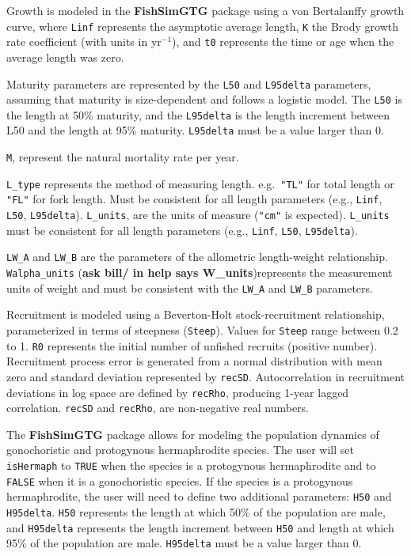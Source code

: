 \documentclass[
]{book}
\begin{document}
Growth is modeled in the \textbf{FishSimGTG} package using a von Bertalanffy growth curve, where \texttt{Linf} represents the asymptotic average length, \texttt{K} the Brody growth rate coefficient (with units in yr\(^{-1}\)), and \texttt{t0} represents the time or age when the average length was zero.

Maturity parameters are represented by the \texttt{L50} and \texttt{L95delta} parameters, assuming that maturity is size-dependent and follows a logistic model. The \texttt{L50} is the length at 50\% maturity, and the \texttt{L95delta} is the length increment between L50 and the length at 95\% maturity. \texttt{L95delta} must be a value larger than 0.

\texttt{M}, represent the natural mortality rate per year.

\texttt{L\_type} represents the method of measuring length. e.g.~\texttt{"TL"} for total length or \texttt{"FL"} for fork length. Must be consistent for all length parameters (e.g., \texttt{Linf}, \texttt{L50}, \texttt{L95delta}). \texttt{L\_units}, are the units of measure (\texttt{"cm"} is expected). \texttt{L\_units} must be consistent for all length parameters (e.g., \texttt{Linf}, \texttt{L50}, \texttt{L95delta}).

\texttt{LW\_A} and \texttt{LW\_B} are the parameters of the allometric length-weight relationship. \texttt{Walpha\_units} (\textbf{ask bill/ in help says W\_units})represents the measurement units of weight and must be consistent with the \texttt{LW\_A} and \texttt{LW\_B} parameters.

Recruitment is modeled using a Beverton-Holt stock-recruitment relationship, parameterized in terms of steepness (\texttt{Steep}). Values for \texttt{Steep} range between 0.2 to 1. \texttt{R0} represents the initial number of unfished recruits (positive number). Recruitment process error is generated from a normal distribution with mean zero and standard deviation represented by \texttt{recSD}. Autocorrelation in recruitment deviations in log space are defined by \texttt{recRho}, producing 1-year lagged correlation. \texttt{recSD} and \texttt{recRho}, are non-negative real numbers.

The \textbf{FishSimGTG} package allows for modeling the population dynamics of gonochoristic and protogynous hermaphrodite species. The user will set \texttt{isHermaph} to \texttt{TRUE} when the species is a protogynous hermaphrodite and to \texttt{FALSE} when it is a gonochoristic species. If the species is a protogynous hermaphrodite, the user will need to define two additional parameters: \texttt{H50} and \texttt{H95delta}. \texttt{H50} represents the length at which 50\% of the population are male, and \texttt{H95delta} represents the length increment between \texttt{H50} and length at which 95\% of the population are male. \texttt{H95delta} must be a value larger than 0.
\end{document}
